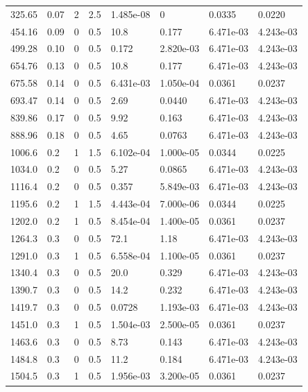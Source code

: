 \documentclass[preview]{standalone}
\begin{document}
{{\begin{tabular}{L{1.2cm}C{1.2cm} C{0.3cm}C{0.5cm} C{1.4cm}C{1.4cm} C{1.4cm}C{1.4cm}}
  325.65  &  0.07  & 2     & 2.5 &  1.485e-08  & 0  & 0.0335 &  0.0220   \\ 
  454.16  &  0.09  & 0     & 0.5 &  10.8  & 0.177  & 6.471e-03 &  4.243e-03   \\ 
  499.28  &  0.10  & 0     & 0.5 &  0.172  & 2.820e-03  & 6.471e-03 &  4.243e-03   \\ 
  654.76  &  0.13  & 0     & 0.5 &  10.8  & 0.177  & 6.471e-03 &  4.243e-03   \\ 
  675.58  &  0.14  & 0     & 0.5 &  6.431e-03  & 1.050e-04  & 0.0361 &  0.0237   \\ 
  693.47  &  0.14  & 0     & 0.5 &  2.69  & 0.0440  & 6.471e-03 &  4.243e-03   \\ 
  839.86  &  0.17  & 0     & 0.5 &  9.92  & 0.163  & 6.471e-03 &  4.243e-03   \\ 
  888.96  &  0.18  & 0     & 0.5 &  4.65  & 0.0763  & 6.471e-03 &  4.243e-03   \\ 
  1006.6  &   0.2  & 1     & 1.5 &  6.102e-04  & 1.000e-05  & 0.0344 &  0.0225   \\ 
  1034.0  &   0.2  & 0     & 0.5 &  5.27  & 0.0865  & 6.471e-03 &  4.243e-03   \\ 
  1116.4  &   0.2  & 0     & 0.5 &  0.357  & 5.849e-03  & 6.471e-03 &  4.243e-03   \\ 
  1195.6  &   0.2  & 1     & 1.5 &  4.443e-04  & 7.000e-06  & 0.0344 &  0.0225   \\ 
  1202.0  &   0.2  & 1     & 0.5 &  8.454e-04  & 1.400e-05  & 0.0361 &  0.0237   \\ 
  1264.3  &   0.3  & 0     & 0.5 &  72.1  & 1.18  & 6.471e-03 &  4.243e-03   \\ 
  1291.0  &   0.3  & 1     & 0.5 &  6.558e-04  & 1.100e-05  & 0.0361 &  0.0237   \\ 
  1340.4  &   0.3  & 0     & 0.5 &  20.0  & 0.329  & 6.471e-03 &  4.243e-03   \\ 
  1390.7  &   0.3  & 0     & 0.5 &  14.2  & 0.232  & 6.471e-03 &  4.243e-03   \\ 
  1419.7  &   0.3  & 0     & 0.5 &  0.0728  & 1.193e-03  & 6.471e-03 &  4.243e-03   \\ 
  1451.0  &   0.3  & 1     & 0.5 &  1.504e-03  & 2.500e-05  & 0.0361 &  0.0237   \\ 
  1463.6  &   0.3  & 0     & 0.5 &  8.73  & 0.143  & 6.471e-03 &  4.243e-03   \\ 
  1484.8  &   0.3  & 0     & 0.5 &  11.2  & 0.184  & 6.471e-03 &  4.243e-03   \\ 
  1504.5  &   0.3  & 1     & 0.5 &  1.956e-03  & 3.200e-05  & 0.0361 &  0.0237   \\ 

\end{tabular}}}
\end{document}
